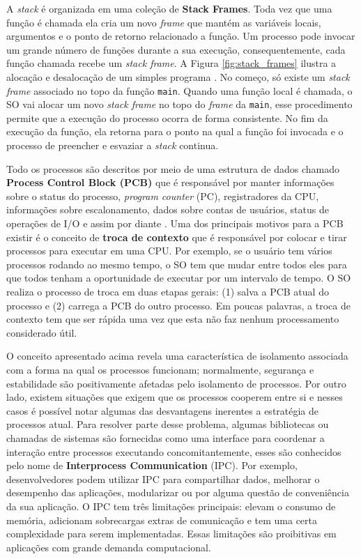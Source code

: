 
A \emph{stack} é organizada em uma coleção de \textbf{Stack Frames}. Toda vez
que uma função é chamada ela cria um novo \emph{frame} que mantém as variáveis
locais, argumentos e o ponto de retorno relacionado a função. Um processo pode
invocar um grande número de funções durante a sua execução, consequentemente,
cada função chamada recebe um \emph{stack frame}. A Figura
\ref{fig:stack_frames} ilustra a alocação e desalocação de um simples programa
\cite{gdb}. No começo, só existe um \emph{stack frame} associado no topo da
função \texttt{main}. Quando uma função local é chamada, o SO vai alocar um
novo \emph{stack frame} no topo do \emph{frame} da \texttt{main}, esse
procedimento permite que a execução do processo ocorra de forma consistente. No
fim da execução da função, ela retorna para o ponto na qual a função foi
invocada e o processo de preencher e esvaziar a \emph{stack} continua.

Todo os processos são descritos por meio de uma estrutura de dados chamado
\textbf{Process Control Block (PCB)} que é responsável por manter informações
sobre o status do processo, \emph{program counter} (PC), registradores da CPU,
informações sobre escalonamento, dados sobre contas de usuários, status de
operações de I/O e assim por diante \citep{silberschatz}. Uma dos principais
motivos para a PCB existir é o conceito de \textbf{troca de contexto} que é
responsável por colocar e tirar processos para executar em uma CPU. Por
exemplo, se o usuário tem vários processos rodando ao mesmo tempo, o SO tem que
mudar entre todos eles para que todos tenham a oportunidade de executar por um
intervalo de tempo. O SO realiza o processo de troca em duas etapas gerais: (1)
salva a PCB atual do processo e (2) carrega a PCB do outro processo. Em
poucas palavras, a troca de contexto tem que ser rápida uma vez que esta não
faz nenhum processamento considerado útil.

O conceito apresentado acima revela uma característica de isolamento associada
com a forma na qual os processos funcionam; normalmente, segurança e
estabilidade são positivamente afetadas pelo isolamento de processos. Por outro
lado, existem situações que exigem que os processos cooperem entre si e nesses
casos é possível notar algumas das desvantagens inerentes a estratégia de
processos atual. Para resolver parte desse problema, algumas bibliotecas ou
chamadas de sistemas são fornecidas como uma interface para coordenar a
interação entre processos executando concomitantemente, esses são conhecidos
pelo nome de \textbf{Interprocess Communication} (IPC). Por exemplo,
desenvolvedores podem utilizar IPC para compartilhar dados, melhorar o
desempenho das aplicações, modularizar ou por alguma questão de conveniência
da sua aplicação. O IPC tem três limitações principais: elevam o consumo de
memória, adicionam sobrecargas extras de comunicação e tem uma certa
complexidade para serem implementadas. Essas limitações são proibitivas em
aplicações com grande demanda computacional.

